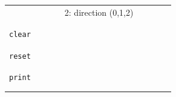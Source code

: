 \documentclass[11pt]{article}
\begin{document}
\begin{center}
\begin{tabular}{cclclclll}
    $\mbox{}$   &&             && 2: direction (0,1,2) && \\
                                   && && && \\
    \hline
                                   && && && \\
    \verb!clear! & & && && \\
                                   && && && \\
    \hline
                                   && && && \\
    \verb!reset! & & && && \\
                                   && && && \\
    \hline
                                   && && && \\
   \verb!print! & & && && \\
                                   && && && \\
    \hline
                                   && && && \\
 
  \end{tabular}

\end{center}
\end{document}
